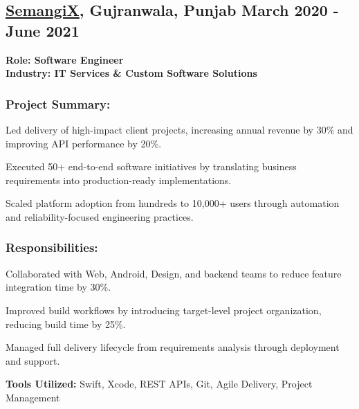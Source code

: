 \subsection{\textbf{\href{https://www.facebook.com/SemangiX/}{SemangiX}, Gujranwala, Punjab} \hfill March 2020 - June 2021}
\noindent\textbf{Role: Software Engineer}\\
\noindent\textbf{Industry: IT Services \& Custom Software Solutions}

\subsubsection*{\textbf{Project Summary:}}
\begin{zitemize}
\item Led delivery of high-impact client projects, increasing annual revenue by 30\% and improving API performance by 20\%.
\item Executed 50+ end-to-end software initiatives by translating business requirements into production-ready implementations.
\item Scaled platform adoption from hundreds to 10,000+ users through automation and reliability-focused engineering practices.
\end{zitemize}

\subsubsection*{\textbf{Responsibilities:}}
\begin{zitemize}
\item Collaborated with Web, Android, Design, and backend teams to reduce feature integration time by 30\%.
\item Improved build workflows by introducing target-level project organization, reducing build time by 25\%.
\item Managed full delivery lifecycle from requirements analysis through deployment and support.
\end{zitemize}

\noindent\textbf{Tools Utilized:} Swift, Xcode, REST APIs, Git, Agile Delivery, Project Management